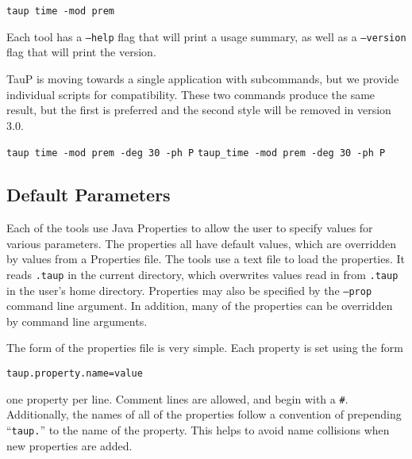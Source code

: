 \texttt{taup time -mod prem}

Each tool has a \texttt{--help} flag that will print a usage summary, as well
as a \texttt{--version} flag that will print the version.

TauP is moving towards a single application with subcommands,
but we provide individual scripts for compatibility. These
two commands produce the same result, but the first is
preferred and the second style will be removed in version 3.0.

\texttt{taup time -mod prem -deg 30 -ph P}
\texttt{taup\_time -mod prem -deg 30 -ph P}

\subsection{Default Parameters} \label{properties}

Each of the tools use Java Properties to allow the user to specify values
for various
parameters. The properties all have default values, which are overridden by
values from a Properties file. The tools use a text file to load the properties. It reads  \texttt{.taup} in the
current directory, which overwrites values read in from
\texttt{.taup} in the user's home directory. Properties may also be specified by
the \texttt{--prop} command line argument.
In addition, many of the properties can be overridden by command line arguments.

The form of the properties file is very simple. Each property is set using
the form
\begin{verbatim}
taup.property.name=value
\end{verbatim}
 one property per line.
Comment lines are allowed, and begin with a \texttt{\#}.
Additionally, the names of all of the properties follow a convention of
prepending ``\texttt{taup.}'' to the name of the property.
This helps to avoid name collisions when new properties
are added.

